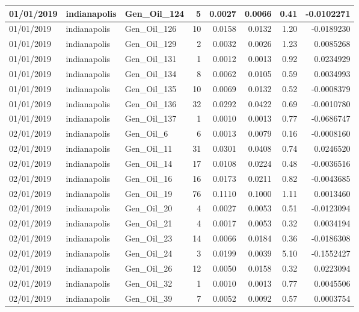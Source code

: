 \documentclass[
  letterpaper,
  DIV=11,
  numbers=noendperiod]{scrartcl}
\begin{document}
\begin{tabular}{l|l|l|r|r|r|r|r}
\hline
01/01/2019 & indianapolis & Gen\_Oil\_124 & 5 & 0.0027 & 0.0066 & 0.41 & -0.0102271\\
\hline
01/01/2019 & indianapolis & Gen\_Oil\_126 & 10 & 0.0158 & 0.0132 & 1.20 & -0.0189230\\
\hline
01/01/2019 & indianapolis & Gen\_Oil\_129 & 2 & 0.0032 & 0.0026 & 1.23 & 0.0085268\\
\hline
01/01/2019 & indianapolis & Gen\_Oil\_131 & 1 & 0.0012 & 0.0013 & 0.92 & 0.0234929\\
\hline
01/01/2019 & indianapolis & Gen\_Oil\_134 & 8 & 0.0062 & 0.0105 & 0.59 & 0.0034993\\
\hline
01/01/2019 & indianapolis & Gen\_Oil\_135 & 10 & 0.0069 & 0.0132 & 0.52 & -0.0008379\\
\hline
01/01/2019 & indianapolis & Gen\_Oil\_136 & 32 & 0.0292 & 0.0422 & 0.69 & -0.0010780\\
\hline
01/01/2019 & indianapolis & Gen\_Oil\_137 & 1 & 0.0010 & 0.0013 & 0.77 & -0.0686747\\
\hline
02/01/2019 & indianapolis & Gen\_Oil\_6 & 6 & 0.0013 & 0.0079 & 0.16 & -0.0008160\\
\hline
02/01/2019 & indianapolis & Gen\_Oil\_11 & 31 & 0.0301 & 0.0408 & 0.74 & 0.0246520\\
\hline
02/01/2019 & indianapolis & Gen\_Oil\_14 & 17 & 0.0108 & 0.0224 & 0.48 & -0.0036516\\
\hline
02/01/2019 & indianapolis & Gen\_Oil\_16 & 16 & 0.0173 & 0.0211 & 0.82 & -0.0043685\\
\hline
02/01/2019 & indianapolis & Gen\_Oil\_19 & 76 & 0.1110 & 0.1000 & 1.11 & 0.0013460\\
\hline
02/01/2019 & indianapolis & Gen\_Oil\_20 & 4 & 0.0027 & 0.0053 & 0.51 & -0.0123094\\
\hline
02/01/2019 & indianapolis & Gen\_Oil\_21 & 4 & 0.0017 & 0.0053 & 0.32 & 0.0034194\\
\hline
02/01/2019 & indianapolis & Gen\_Oil\_23 & 14 & 0.0066 & 0.0184 & 0.36 & -0.0186308\\
\hline
02/01/2019 & indianapolis & Gen\_Oil\_24 & 3 & 0.0199 & 0.0039 & 5.10 & -0.1552427\\
\hline
02/01/2019 & indianapolis & Gen\_Oil\_26 & 12 & 0.0050 & 0.0158 & 0.32 & 0.0223094\\
\hline
02/01/2019 & indianapolis & Gen\_Oil\_32 & 1 & 0.0010 & 0.0013 & 0.77 & 0.0045506\\
\hline
02/01/2019 & indianapolis & Gen\_Oil\_39 & 7 & 0.0052 & 0.0092 & 0.57 & 0.0003754\\

\end{tabular}
\end{document}
